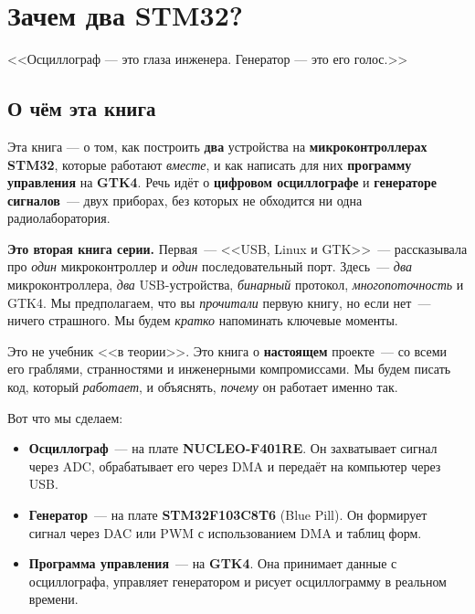 
\chapter{Зачем два STM32?}
\label{ch:intro}

\epigraph{<<Осциллограф — это глаза инженера.
Генератор — это его голос.>>}{}

\section{О чём эта книга}
\label{sec:intro-about}

Эта книга — о том, как построить \textbf{два} устройства
на \textbf{микроконтроллерах STM32}, которые работают
\emph{вместе}, и как написать для них \textbf{программу
управления} на \textbf{GTK4}. Речь идёт о
\textbf{цифровом осциллографе} и \textbf{генераторе сигналов}~---
двух приборах, без которых не обходится ни одна
радиолаборатория.

\begin{ideabox}
\textbf{Это вторая книга серии.} Первая~--- <<USB, Linux и GTK>>~---
рассказывала про \emph{один} микроконтроллер и \emph{один}
последовательный порт. Здесь~--- \emph{два} микроконтроллера,
\emph{два} USB-устройства, \emph{бинарный} протокол,
\emph{многопоточность} и GTK4. Мы предполагаем, что вы
\emph{прочитали} первую книгу, но если нет~--- ничего страшного.
Мы будем \emph{кратко} напоминать ключевые моменты.
\end{ideabox}

Это не учебник <<в теории>>. Это книга о \textbf{настоящем}
проекте~--- со всеми его граблями, странностями и
инженерными компромиссами. Мы будем писать код, который
\emph{работает}, и объяснять, \emph{почему} он работает
именно так.

Вот что мы сделаем:

\begin{itemize}
    \item \textbf{Осциллограф}~--- на плате \textbf{NUCLEO-F401RE}.
          Он захватывает сигнал через ADC, обрабатывает его
          через DMA и передаёт на компьютер через USB.
    \item \textbf{Генератор}~--- на плате \textbf{STM32F103C8T6}
          (Blue Pill). Он формирует сигнал через DAC или PWM
          с использованием DMA и таблиц форм.
    \item \textbf{Программа управления}~--- на \textbf{GTK4}.
          Она принимает данные с осциллографа, управляет
          генератором и рисует осциллограмму в реальном времени.
\end{itemize}

